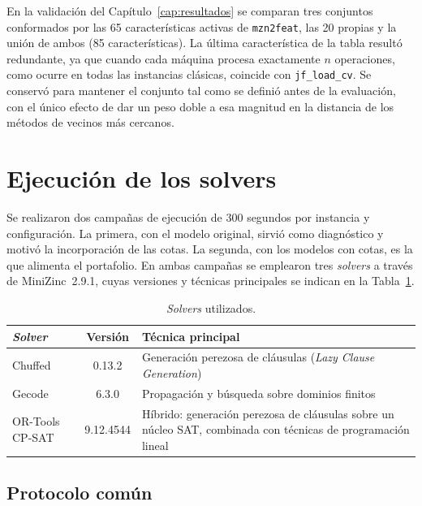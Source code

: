 En la validación del Capítulo~\ref{cap:resultados} se comparan tres conjuntos
conformados por las 65 características activas de \texttt{mzn2feat}, las 20
propias y la unión de ambos (85 características). La última característica de
la tabla resultó redundante, ya que cuando cada máquina procesa exactamente $n$
operaciones, como ocurre en todas las instancias clásicas, coincide con
\texttt{jf\_load\_cv}. Se conservó para mantener el conjunto tal como se
definió antes de la evaluación, con el único efecto de dar un peso doble a esa
magnitud en la distancia de los métodos de vecinos más cercanos.

\section{Ejecución de los solvers}
\label{sec:ejecucion_solvers}

Se realizaron dos campañas de ejecución de 300 segundos por instancia y
configuración. La primera, con el modelo original, sirvió como diagnóstico y
motivó la incorporación de las cotas. La segunda, con los modelos con cotas,
es la que alimenta el portafolio. En ambas campañas se emplearon tres
\textit{solvers} a través de MiniZinc~2.9.1, cuyas versiones y técnicas
principales se indican en la Tabla~\ref{tab:solvers}.

\begin{table}[H]
  \centering
  \small
  \singlespacing
  \caption{\textit{Solvers} utilizados.}
  \label{tab:solvers}
  \begin{tabularx}{\textwidth}{l c >{\raggedright\arraybackslash}X}
    \toprule
    \textbf{\textit{Solver}} & \textbf{Versión} & \textbf{Técnica principal} \\
    \midrule
    Chuffed & 0.13.2 & Generación perezosa de cláusulas (\textit{Lazy Clause Generation}) \\
    Gecode  & 6.3.0  & Propagación y búsqueda sobre dominios finitos \\
    OR-Tools CP-SAT & 9.12.4544 & Híbrido: generación perezosa de cláusulas sobre un núcleo SAT, combinada con técnicas de programación lineal \\
    \bottomrule
  \end{tabularx}
\end{table}

\subsection{Protocolo común}


